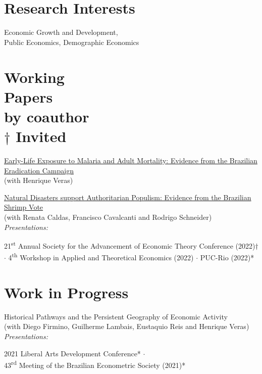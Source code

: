 \documentclass[mm, 10pt]{simple_style}
\begin{document}
\begin{resume}
\section{Research Interests}

Economic Growth and Development,   \\
Public Economics, Demographic Economics


\section{Working \\ Papers \\ {\protect\footnotesize \null * by coauthor \\ $\dagger$ Invited}}

\href{https://drive.google.com/file/d/1dIZK5thBKYu-IsduU5E65SdG_z4sQW8h/view}{Early-Life Exposure to Malaria and Adult Mortality: Evidence from the Brazilian Eradication Campaign}\\
(with Henrique Veras)

\href{https://papers.ssrn.com/sol3/papers.cfm?abstract_id=4249006}{Natural Disasters support Authoritarian Populism: Evidence from the Brazilian Shrimp Vote} \\
(with Renata Caldas, Francisco Cavalcanti and Rodrigo Schneider) \\
\textit{Presentations:} 
\begin{minipage}[t]{0.7\textwidth}
21\textsuperscript{st} Annual Society for the Advancement of Economic Theory Conference (2022)$\dagger$ $\cdot$ 
 4\textsuperscript{th} Workshop in Applied and Theoretical Economics (2022) $\cdot$ 
 PUC-Rio (2022)*
\end{minipage}

\section{Work in Progress}

Historical Pathways and the Persistent Geography of Economic Activity \\
(with Diego Firmino, Guilherme Lambais, Eustaquio Reis and Henrique Veras) \\
\textit{Presentations:} 
\begin{minipage}[t]{0.7\textwidth}
2021 Liberal Arts Development Conference* $\cdot$  \\ 43\textsuperscript{rd} Meeting of the Brazilian Econometric Society (2021)*
\end{minipage}


\end{resume}
\end{document}
